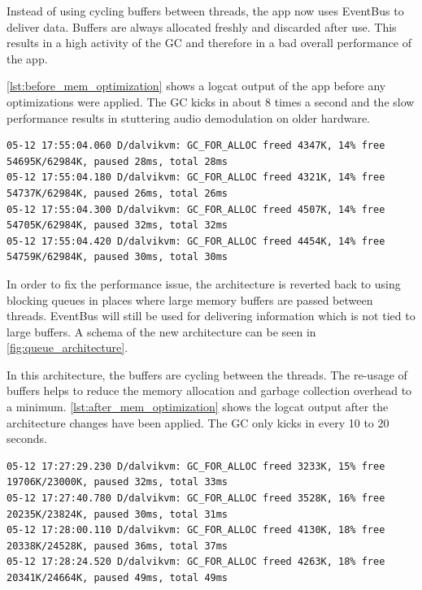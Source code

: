 Instead of using cycling buffers between threads, the app now uses
EventBus to deliver data. Buffers are always allocated freshly
and discarded after use. This results in a high activity of the
\ac{GC} and therefore in a bad overall performance of the app.

\autoref{lst:before_mem_optimization} shows a logcat output of the
app before any optimizations were applied. The \ac{GC} kicks in about 8 times a second
and the slow performance results in stuttering audio demodulation on
older hardware.

\begin{lstlisting}[label=lst:before_mem_optimization, caption=Logcat output
before memory optimizations]
05-12 17:55:04.060 D/dalvikvm: GC_FOR_ALLOC freed 4347K, 14% free 54695K/62984K, paused 28ms, total 28ms
05-12 17:55:04.180 D/dalvikvm: GC_FOR_ALLOC freed 4321K, 14% free 54737K/62984K, paused 26ms, total 26ms
05-12 17:55:04.300 D/dalvikvm: GC_FOR_ALLOC freed 4507K, 14% free 54705K/62984K, paused 32ms, total 32ms
05-12 17:55:04.420 D/dalvikvm: GC_FOR_ALLOC freed 4454K, 14% free 54759K/62984K, paused 30ms, total 30ms
\end{lstlisting}

In order to fix the performance issue, the architecture is reverted
back to using blocking queues in places where large memory buffers are passed
between threads. EventBus will still be used for delivering information
which is not tied to large buffers. A schema of the new architecture
can be seen in \autoref{fig:queue_architecture}. 

In this architecture, the buffers are cycling between the threads. The re-usage
of buffers helps to reduce the memory allocation and garbage collection
overhead to a minimum. \autoref{lst:after_mem_optimization} shows the
logcat output after the architecture changes have been applied. The \ac{GC}
only kicks in every 10 to 20 seconds.

\begin{lstlisting}[label=lst:after_mem_optimization, caption=Logcat output
after memory optimizations]
05-12 17:27:29.230 D/dalvikvm: GC_FOR_ALLOC freed 3233K, 15% free 19706K/23000K, paused 32ms, total 33ms
05-12 17:27:40.780 D/dalvikvm: GC_FOR_ALLOC freed 3528K, 16% free 20235K/23824K, paused 30ms, total 31ms
05-12 17:28:00.110 D/dalvikvm: GC_FOR_ALLOC freed 4130K, 18% free 20338K/24528K, paused 36ms, total 37ms
05-12 17:28:24.520 D/dalvikvm: GC_FOR_ALLOC freed 4263K, 18% free 20341K/24664K, paused 49ms, total 49ms
\end{lstlisting}


%
